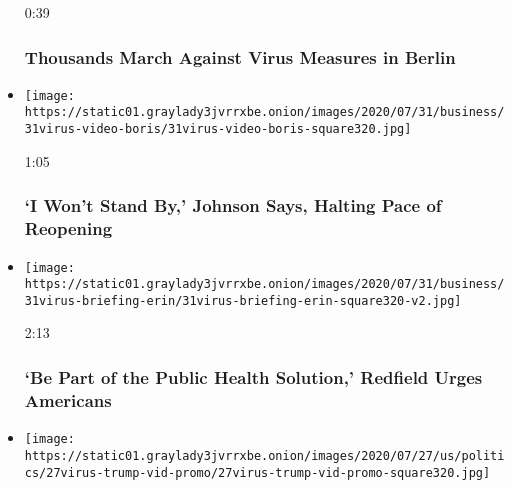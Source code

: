 \begin{itemize}
  0:39

  \hypertarget{thousands-march-against-virus-measures-in-berlin}{%
  \subsubsection{Thousands March Against Virus Measures in
  Berlin}\label{thousands-march-against-virus-measures-in-berlin}}
\item
  \href{https://www.nytimes3xbfgragh.onion/video/us/politics/100000007266983/johnson-coronavirus-restrictions.html?action=click\&module=video-series-bar\&region=header\&pgtype=Article\&playlistId=video/coronavirus-news-update}{}

  \texttt{[image: https://static01.graylady3jvrrxbe.onion/images/2020/07/31/business/31virus-video-boris/31virus-video-boris-square320.jpg]}

  1:05

  \hypertarget{i-wont-stand-by-johnson-says-halting-pace-of-reopening}{%
  \subsubsection{`I Won't Stand By,' Johnson Says, Halting Pace of
  Reopening}\label{i-wont-stand-by-johnson-says-halting-pace-of-reopening}}
\item
  \href{https://www.nytimes3xbfgragh.onion/video/us/politics/100000007266691/fauci-congress-testimony.html?action=click\&module=video-series-bar\&region=header\&pgtype=Article\&playlistId=video/coronavirus-news-update}{}

  \texttt{[image: https://static01.graylady3jvrrxbe.onion/images/2020/07/31/business/31virus-briefing-erin/31virus-briefing-erin-square320-v2.jpg]}

  2:13

  \hypertarget{be-part-of-the-public-health-solution-redfield-urges-americans}{%
  \subsubsection{`Be Part of the Public Health Solution,' Redfield Urges
  Americans}\label{be-part-of-the-public-health-solution-redfield-urges-americans}}
\item
  \href{https://www.nytimes3xbfgragh.onion/video/us/100000007258794/trump-boasts-vaccine-progress-north-carolina.html?action=click\&module=video-series-bar\&region=header\&pgtype=Article\&playlistId=video/coronavirus-news-update}{}

  \texttt{[image: https://static01.graylady3jvrrxbe.onion/images/2020/07/27/us/politics/27virus-trump-vid-promo/27virus-trump-vid-promo-square320.jpg]}


\end{itemize}
